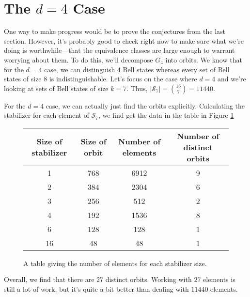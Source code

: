 \section{The $d = 4$ Case}

One way to make progress would be to prove the conjectures from the last section. However, it's probably good to check right now to make sure what we're doing is worthwhile---that the equivalence classes are large enough to warrant worrying about them. To do this, we'll decompose $G_4$ into orbits. We know that for the $d=4$ case, we can distinguish $4$ Bell states whereas every set of Bell states of size $8$ is indistinguishable. Let's focus on the case where $d = 4$ and we're looking at sets of Bell states of size $k = 7$. Thus, $|\mathcal{S}_7| = \binom{16}{7} = 11440$.

For the $d=4$ case, we can actually just find the orbits explicitly. Calculating the stabilizer for each element of $\mathcal{S}_7$, we find get the data in the table in Figure \ref{fig:table2}

\begin{figure}
\begin{center}
\begin{tabular}{ | c | c | c | c |} 
\hline
 Size of stabilizer & Size of orbit & Number of elements & Number of distinct orbits \\ 
\hline
1 & 768 & 6912 & 9\\ 
\hline
2 & 384 & 2304 & 6\\ 
\hline
3 & 256 & 512 & 2 \\ 
\hline
4 & 192 & 1536 & 8 \\ 
\hline
6 & 128 & 128 & 1 \\ 
\hline
16 & 48 & 48 & 1 \\ 
\hline
\end{tabular}
\end{center}
\caption{A table giving the number of elements for each stabilizer size.} \label{fig:table2}
\end{figure}

Overall, we find that there are $27$ distinct orbits. Working with $27$ elements is still a lot of work, but it's quite a bit better than dealing with $11440$ elements.